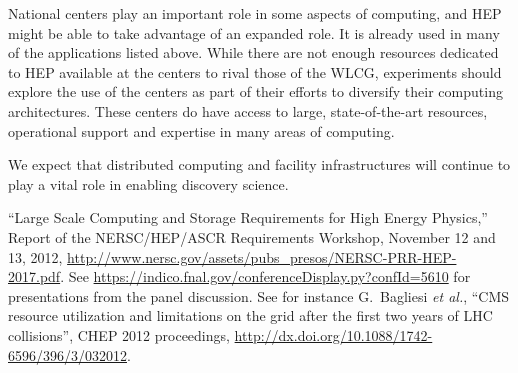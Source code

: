 National centers play an important role in some aspects of computing, and HEP might be able to take advantage of an expanded role.  It is already used in many of the applications listed above.  While there are not enough resources dedicated to HEP available at the centers to rival those of the WLCG, experiments should explore the use of the centers as part of their efforts to diversify their computing architectures.  These centers do have access to large, state-of-the-art resources, operational support and expertise in many areas of computing.

We expect that distributed computing and facility infrastructures will continue to play a vital role in enabling discovery science.


\begin{thebibliography}{99}
 ``Large Scale Computing and Storage Requirements for High Energy Physics,'' Report of the NERSC/HEP/ASCR Requirements Workshop, November 12 and 13, 2012, \url{http://www.nersc.gov/assets/pubs_presos/NERSC-PRR-HEP-2017.pdf}.
 See \url{https://indico.fnal.gov/conferenceDisplay.py?confId=5610} for presentations from the panel discussion.
 See for instance G.~Bagliesi {\it et al.}, ``CMS resource utilization and limitations on the grid after the first two years of LHC collisions'', CHEP 2012 proceedings, \url{http://dx.doi.org/10.1088/1742-6596/396/3/032012}.
\end{thebibliography}


